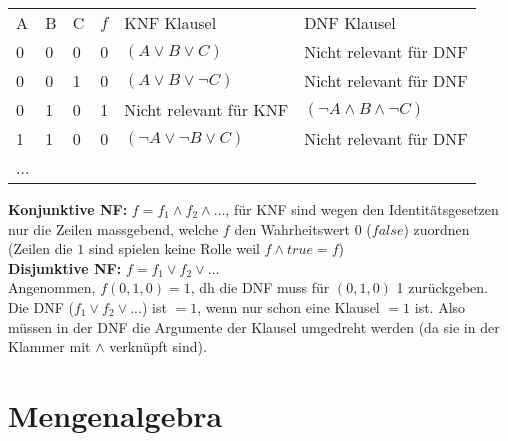 \documentclass[8pt,landscape]{scrartcl}
\begin{document}
\begin{multicols}{3}
\begin{small}
\begin{tabular}{lll|c | ll}
A & B & C & $f$ & KNF Klausel                      & DNF Klausel                     \\ \cline{1-6} 
0 & 0 & 0 & 0   &  $(A \lor B \lor C)$             & Nicht relevant für DNF          \\
0 & 0 & 1 & 0   &  $(A \lor B \lor \lnot C)$       & Nicht relevant für DNF          \\
0 & 1 & 0 & 1   &  Nicht relevant für KNF          & $(\lnot A \land B \land \lnot C)$ \\
1 & 1 & 0 & 0   &  $(\lnot A \lor \lnot B \lor C)$ & Nicht relevant für DNF          \\
... & & & 
\end{tabular}
\end{small}

\textbf{Konjunktive NF:} $f = f_1 \land f_2 \land \dots$, f\"ur KNF sind wegen den Identit\"atsgesetzen nur die Zeilen massgebend, welche $f$ den Wahrheitswert 0 ($false$) zuordnen (Zeilen die $1$ sind spielen keine Rolle weil $f \land true = f$)\\

\textbf{Disjunktive NF:} $f = f_1 \lor f_2 \lor \dots$\\
Angenommen, $f(0, 1, 0) = 1$, dh die DNF muss für $(0, 1, 0)$ 1 zurückgeben.
Die DNF ($f_1 \lor f_2 \lor ...$) ist $=1$, wenn nur schon eine Klausel $=1$ ist.
Also m\"ussen in der DNF die Argumente der Klausel umgedreht werden (da sie in der Klammer mit $\land$ verkn\"upft sind).



\section{Mengenalgebra}


\end{multicols}
\end{document}
